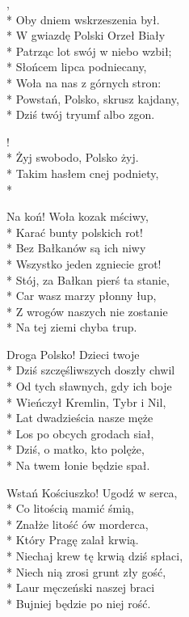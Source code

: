 \begin{lyrics}[longestline={Niech krwią zlane w bojach srogich,}]

,\\*
Oby dniem wskrzeszenia był.\\*
W gwiazdę Polski Orzeł Biały\\*
Patrząc lot swój w niebo wzbił;\\*
Słońcem lipca podniecany,\\*
Woła na nas z górnych stron:\\*
Powstań, Polsko, skrusz kajdany,\\*
Dziś twój tryumf albo zgon.

\begin{chorus}
!\\*
Żyj swobodo, Polsko żyj.\\*
Takim hasłem cnej podniety,\\*
\end{chorus}

Na koń! Woła kozak mściwy,\\*
Karać bunty polskich rot!\\*
Bez Bałkanów są ich niwy\\*
Wszystko jeden zgniecie grot!\\*
Stój, za Bałkan pierś ta stanie,\\*
Car wasz marzy płonny łup,\\*
Z wrogów naszych nie zostanie\\*
Na tej ziemi chyba trup.

\chorusref

Droga Polsko! Dzieci twoje\\*
Dziś szczęśliwszych doszły chwil\\*
Od tych sławnych, gdy ich boje\\*
Wieńczył Kremlin, Tybr i Nil,\\*
Lat dwadzieścia nasze męże\\*
Los po obcych grodach siał,\\*
Dziś, o matko, kto polęże,\\*
Na twem łonie będzie spał.

\chorusref

\breaklyrics

Wstań Kościuszko! Ugodź w serca,\\*
Co litością mamić śmią,\\*
Znałże litość ów morderca,\\*
Który Pragę zalał krwią.\\*
Niechaj krew tę krwią dziś spłaci,\\*
Niech nią zrosi grunt zły gość,\\*
Laur męczeński naszej braci\\*
Bujniej będzie po niej rość.


\end{lyrics}
